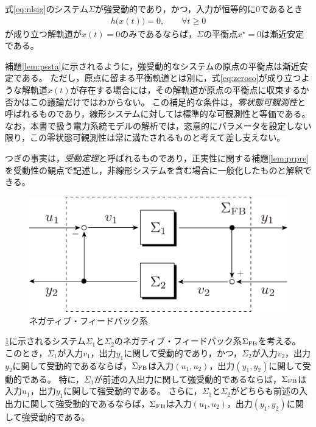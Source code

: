\documentclass[tombow,dvipdfmx]{corona-a5}
\begin{document}
\begin{補題}\label{lem:pssta}
式\ref{eq:nlsig}のシステム$\Sigma$が強受動的であり，かつ，入力が恒等的に0であるとき
\begin{align}\label{eq:zeroso}
h\bigl(
x(t)
\bigr)=0,\qquad
\forall t\geq 0
\end{align}
が成り立つ解軌道が$x(t)=0$のみであるならば，$\Sigma$の平衡点$x^{\star}=0$は漸近安定である。
\end{補題}

\begin{証明}
\end{証明}

補題\ref{lem:pssta}に示されるように，強受動的なシステムの原点の平衡点は漸近安定である。
ただし，原点に留まる平衡軌道とは別に，式\ref{eq:zeroso}が成り立つような解軌道$x(t)$が存在する場合には，その解軌道が原点の平衡点に収束するか否かはこの議論だけではわからない。
この補足的な条件は，\emph{零状態可観測性}と呼ばれるものであり，線形システムに対しては標準的な可観測性と等価である。
なお，本書で扱う電力系統モデルの解析では，恣意的にパラメータを設定しない限り，この零状態可観測性は常に満たされるものと考えて差し支えない。


つぎの事実は，\emph{受動定理}と呼ばれるものであり，正実性に関する補題\ref{lem:prpre}を受動性の観点で記述し，非線形システムを含む場合に一般化したものと解釈できる。

\begin{figure}[t]
  \centering
  \includegraphics[width = .40\linewidth]{figs/fbnlin}
  \caption{ネガティブ・フィードバック系}
  \label{fig:stasig12}
\end{figure}

\begin{定理}\label{thm:psthm}
\ref{fig:stasig12}に示されるシステム$\Sigma_1$と$\Sigma_2$のネガティブ・フィードバック系$\Sigma_{\rm FB}$を考える。
このとき，$\Sigma_1$が入力$v_1$，出力$y_1$に関して受動的であり，かつ，$\Sigma_2$が入力$v_2$，出力$y_2$に関して受動的であるならば，$\Sigma_{\rm FB}$は入力$(u_1,u_2)$，出力$(y_1,y_2)$に関して受動的である。
特に，$\Sigma_1$が前述の入出力に関して強受動的であるならば，$\Sigma_{\rm FB}$は入力$u_1$，出力$y_1$に関して強受動的である。
さらに，$\Sigma_1$と$\Sigma_2$がどちらも前述の入出力に関して強受動的であるならば，$\Sigma_{\rm FB}$は入力$(u_1,u_2)$，出力$(y_1,y_2)$に関して強受動的である。
\end{定理}
\end{document}
